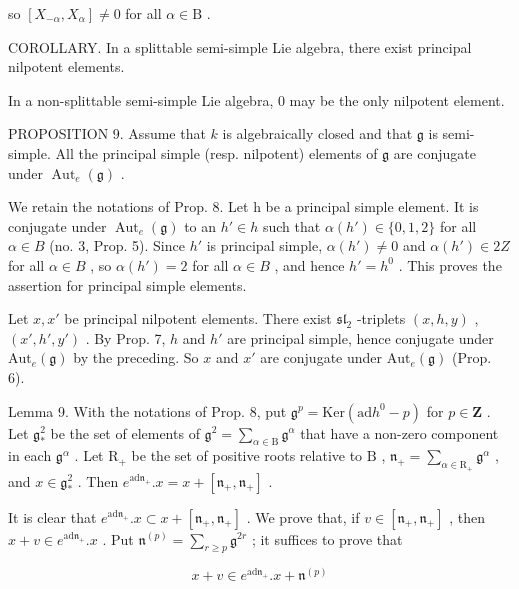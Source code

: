so \([X_{-\alpha}, X_{\alpha}] \neq 0\) for all \(\alpha \in \mathrm{B}\) .

COROLLARY. In a splittable semi-simple Lie algebra, there exist principal nilpotent elements.

In a non-splittable semi-simple Lie algebra, 0 may be the only nilpotent element.

PROPOSITION 9. Assume that \(k\) is algebraically closed and that \(\mathfrak{g}\) is semi-simple. All the principal simple (resp. nilpotent) elements of \(\mathfrak{g}\) are conjugate under \(\operatorname{Aut}_e(\mathfrak{g})\) .

We retain the notations of Prop. 8. Let h be a principal simple element. It is conjugate under \(\operatorname{Aut}_{e}(\mathfrak{g})\) to an \(h' \in h\) such that \(\alpha(h') \in \{0,1,2\}\) for all \(\alpha \in B\) (no. 3, Prop. 5). Since \(h'\) is principal simple, \(\alpha(h') \neq 0\) and \(\alpha(h') \in 2Z\) for all \(\alpha \in B\) , so \(\alpha(h') = 2\) for all \(\alpha \in B\) , and hence \(h' = h^{0}\) . This proves the assertion for principal simple elements.

Let \(x, x'\) be principal nilpotent elements. There exist \(\mathfrak{sl}_2\) -triplets \((x, h, y)\) , \((x', h', y')\) . By Prop. 7, \(h\) and \(h'\) are principal simple, hence conjugate under \(\mathrm{Aut}_e(\mathfrak{g})\) by the preceding. So \(x\) and \(x'\) are conjugate under \(\mathrm{Aut}_e(\mathfrak{g})\) (Prop. 6).

Lemma 9. With the notations of Prop. 8, put \(\mathfrak{g}^p = \mathrm{Ker}(\mathrm{ad}h^0 - p)\) for \(p \in \mathbf{Z}\) . Let \(\mathfrak{g}_*^2\) be the set of elements of \(\mathfrak{g}^2 = \sum_{\alpha \in \mathrm{B}} \mathfrak{g}^\alpha\) that have a non-zero component in each \(\mathfrak{g}^\alpha\) . Let \(\mathrm{R}_+\) be the set of positive roots relative to \(\mathrm{B}\) , \(\mathfrak{n}_+ = \sum_{\alpha \in \mathrm{R}_+} \mathfrak{g}^\alpha\) , and \(x \in \mathfrak{g}_*^2\) . Then \(e^{\mathrm{ad}\mathfrak{n}_+}. x = x + [\mathfrak{n}_+, \mathfrak{n}_+]\) .

It is clear that \(e^{\mathrm{ad} \mathfrak{n}_+}.x \subset x + [\mathfrak{n}_+, \mathfrak{n}_+]\) . We prove that, if \(v \in [\mathfrak{n}_+, \mathfrak{n}_+]\) , then \(x + v \in e^{\mathrm{ad} \mathfrak{n}_+}.x\) . Put \(\mathfrak{n}^{(p)} = \sum_{r \geq p} \mathfrak{g}^{2r}\) ; it suffices to prove that

\[
x + v \in e ^ {\mathrm{ad} \mathfrak {n} _ {+}}. x + \mathfrak {n} ^ {(p)}
\]

